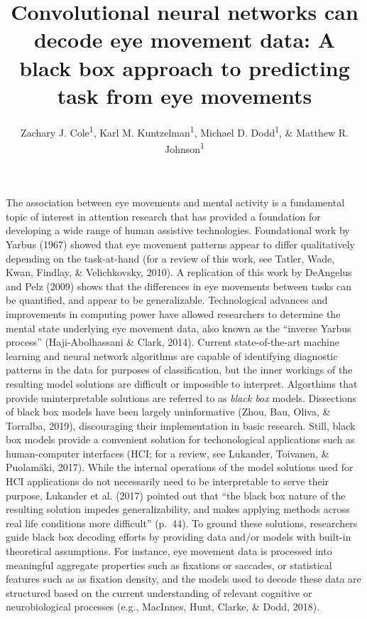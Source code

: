 \documentclass[
  english,
  man,floatsintext]{apa6}
\author{Zachary J. Cole\textsuperscript{1}, Karl M. Kuntzelman\textsuperscript{1}, Michael D. Dodd\textsuperscript{1}, \& Matthew R. Johnson\textsuperscript{1}}
\affiliation{
\vspace{0.5cm}
\textsuperscript{1} University of Nebraska-Lincoln}
\title{Convolutional neural networks can decode eye movement data: A black box approach to predicting task from eye movements}
\date{}
\begin{document}
\maketitle

\section{}

The association between eye movements and mental activity is a fundamental topic of interest in attention research that has provided a foundation for developing a wide range of human assistive technologies. Foundational work by Yarbus (1967) showed that eye movement patterns appear to differ qualitatively depending on the task-at-hand (for a review of this work, see Tatler, Wade, Kwan, Findlay, \& Velichkovsky, 2010). A replication of this work by DeAngelus and Pelz (2009) shows that the differences in eye movements between tasks can be quantified, and appear to be generalizable. Technological advances and improvements in computing power have allowed researchers to determine the mental state underlying eye movement data, also known as the \enquote{inverse Yarbus process} (Haji-Abolhassani \& Clark, 2014). Current state-of-the-art machine learning and neural network algorithms are capable of identifying diagnostic patterns in the data for purposes of classification, but the inner workings of the resulting model solutions are difficult or impossible to interpret. Algorthims that provide uninterpretable solutions are referred to as \emph{black box} models. Dissections of black box models have been largely uninformative (Zhou, Bau, Oliva, \& Torralba, 2019), discouraging their implementation in basic research. Still, black box models provide a convenient solution for techonological applications such as human-computer interfaces (HCI; for a review, see Lukander, Toivanen, \& Puolamäki, 2017). While the internal operations of the model solutions used for HCI applications do not necessarily need to be interpretable to serve their purpose, Lukander et al. (2017) pointed out that \enquote{the black box nature of the resulting solution impedes generalizability, and makes applying methods across real life conditions more difficult} (p.~44). To ground these solutions, researchers guide black box decoding efforts by providing data and/or models with built-in theoretical assumptions. For instance, eye movement data is processed into meaningful aggregate properties such as fixations or saccades, or statistical features such as as fixation density, and the models used to decode these data are structured based on the current understanding of relevant cognitive or neurobiological processes (e.g., MacInnes, Hunt, Clarke, \& Dodd, 2018).
\end{document}

